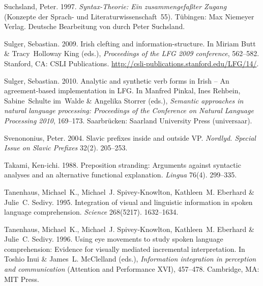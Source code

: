 \begin{thebibliography}{1420}
Suchsland, Peter. 1997.
\newblock \emph{{Syntax-Theorie: Ein zusammengefa{\ss}ter Zugang}} (Konzepte
  der Sprach- und Literaturwissenschaft~55).
\newblock T{\"u}bingen: Max Niemeyer Verlag.
\newblock Deutsche Bearbeitung von \cite{Borsley91a} durch Peter Suchsland.

Sulger, Sebastian. 2009.
\newblock Irish clefting and information-structure.
\newblock In Miriam Butt \& Tracy~Holloway King (eds.), \emph{Proceedings of
  the {LFG 2009} conference}, 562--582. Stanford, CA: CSLI Publications.
\newblock \urlprefix\url{http://csli-publications.stanford.edu/LFG/14/}.

Sulger, Sebastian. 2010.
\newblock Analytic and synthetic verb forms in {Irish} -- {An} agreement-based
  implementation in {LFG}.
\newblock In Manfred Pinkal, Ines Rehbein, Sabine~Schulte im~Walde \& Angelika
  Storrer (eds.), \emph{Semantic approaches in natural language processing:
  {Proceedings} of the {Conference on Natural Language Processing 2010}},
  169--173. Saarbr{\"u}cken: Saarland University Press (universaar).

Svenononius, Peter. 2004.
\newblock Slavic prefixes inside and outside {VP}.
\newblock \emph{Nordlyd. Special Issue on {Slavic} Prefixes} 32(2). 205--253.

Takami, {Ken-ichi}. 1988.
\newblock Preposition stranding: {Arguments} against syntactic analyses and an
  alternative functional explanation.
\newblock \emph{Lingua} 76(4). 299--335.

Tanenhaus, Michael~K., Michael~J. Spivey-Knowlton, Kathleen~M. Eberhard \&
  Julie~C. Sedivy. 1995.
\newblock Integration of visual and linguistic information in spoken language
  comprehension.
\newblock \emph{Science} 268(5217). 1632--1634.

Tanenhaus, Michael~K., Michael~J. Spivey-Knowlton, Kathleen~M. Eberhard \&
  Julie~C. Sedivy. 1996.
\newblock Using eye movements to study spoken language comprehension:
  {Evidence} for visually mediated incremental interpretation.
\newblock In Toshio Inui \& James~L. McClelland (eds.), \emph{Information
  integration in perception and communication} (Attention and Performance XVI),
  457--478. Cambridge, MA: MIT Press.


\end{thebibliography}
